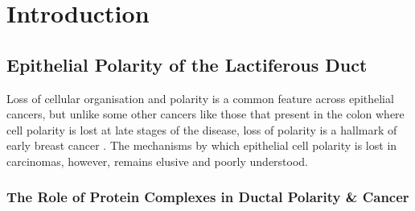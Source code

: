 \section{Introduction}
\subsection{Epithelial Polarity of the Lactiferous Duct}


Loss of cellular organisation and polarity is a common feature across epithelial
cancers, but unlike some other cancers like those that present in the colon
where cell polarity is lost at late stages of the disease, loss of polarity is
a hallmark of early breast cancer \citep{hinck2014}. The
mechanisms by which epithelial cell polarity is lost in carcinomas, however,
remains elusive and poorly understood.\par

\subsubsection{The Role of Protein Complexes in Ductal Polarity \& Cancer}

%
%
%
%
%

